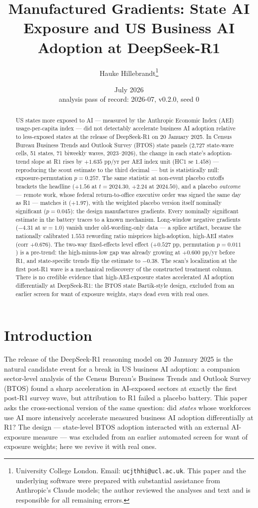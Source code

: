 \documentclass[11pt]{article}
\title{Manufactured Gradients: State AI Exposure and US Business AI
Adoption at DeepSeek-R1}
\author{Hauke Hillebrandt\thanks{University College London. Email:
\texttt{ucjthhi@ucl.ac.uk}. This paper and the underlying \natex{} software were
prepared with substantial assistance from Anthropic's Claude models; the author
reviewed the analyses and text and is responsible for all remaining errors.}}
\date{July 2026 \\ \small analysis pass of record: 2026-07, \natex{} v0.2.0, seed 0}
\begin{document}
\maketitle

\begin{abstract}
\noindent US states more exposed to AI --- measured by the Anthropic Economic
Index (AEI) usage-per-capita index --- did not detectably accelerate business
AI adoption relative to less-exposed states at the release of DeepSeek-R1 on
20 January 2025. In Census Bureau Business Trends and Outlook Survey (BTOS)
state panels (2{,}727 state-wave cells, 51 states, 71 biweekly waves,
2023--2026), the change in each state's adoption-trend slope at R1 rises by
$+1.635$ pp/yr per AEI index unit (HC1 se $1.458$) --- reproducing the scout
estimate to the third decimal --- but is statistically null:
exposure-permutation $p=0.257$. The same statistic at non-event placebo
cutoffs brackets the headline ($+1.56$ at $t=2024.30$, $+2.24$ at $2024.50$),
and a placebo \emph{outcome} --- remote work, whose federal return-to-office
executive order was signed the same day as R1 --- matches it ($+1.97$), with
the weighted placebo version itself nominally significant ($p=0.045$): the
design manufactures gradients. Every nominally significant estimate in the
battery traces to a known mechanism. Long-window negative gradients ($-4.31$
at $w=1.0$) vanish under old-wording-only data --- a splice artifact, because
the nationally calibrated $1.553$ rewording ratio misprices high-adoption,
high-AEI states (corr $+0.676$). The two-way fixed-effects level effect
($+0.527$ pp, permutation $p=0.011$) is a pre-trend: the high-minus-low gap
was already growing at $+0.600$ pp/yr before R1, and state-specific trends
flip the estimate to $-0.38$. The scan's localization at the first post-R1
wave is a mechanical rediscovery of the constructed treatment column. There
is no credible evidence that high-AEI-exposure states accelerated AI adoption
differentially at DeepSeek-R1: the BTOS state Bartik-style design, excluded
from an earlier screen for want of exposure weights, stays dead even with
real ones.
\end{abstract}

\section{Introduction}\label{sec:intro}

The release of the DeepSeek-R1 reasoning model on 20 January 2025
\cite{guo2025} is the natural candidate event for a break in US business AI
adoption: a companion sector-level analysis \cite{hillebrandt2026r1} of the
Census Bureau's Business Trends and Outlook Survey (BTOS) found a sharp
acceleration in AI-exposed sectors at exactly the first post-R1 survey wave,
but attribution to R1 failed a placebo battery. This paper asks the
cross-sectional version of the same question: did \emph{states} whose
workforces use AI more intensively accelerate measured business AI adoption
differentially at R1? The design --- state-level BTOS adoption interacted
with an external AI-exposure measure --- was excluded from an earlier
automated screen for want of exposure weights; here we revive it with real
ones.
\end{document}
